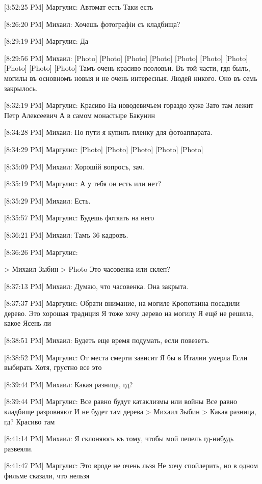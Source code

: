 \documentclass{article}
\newcommand{\yat}{{\fontencoding{X2}\selectfont\cyryat}} %
\begin{document}
{[3:52:25 PM] Маргулис:
Автомат есть
 Таки есть

[8:26:20 PM] Михаил:
Хочешь фотографіи съ кладбища?

[8:29:19 PM] Маргулис:
Да

[8:29:56 PM] Михаил:
[Photo]
 [Photo]
 [Photo]
 [Photo]
 [Photo]
 [Photo]
 [Photo]
 [Photo]
 [Photo]
 [Photo]
 Тамъ очень красиво п соловьи. Въ той части, гд\yat я былъ, могилы въ основномъ новыя и не очень интересныя.
 Людей никого.
 Оно въ семь закрылось.

[8:32:19 PM] Маргулис:
Красиво
 На новодевичьем гораздо хуже
 Зато там лежит Петр Алексеевич
 А в самом монастыре Бакунин

[8:34:28 PM] Михаил:
По пути я купилъ пленку для фотоаппарата.

[8:34:29 PM] Маргулис:
[Photo]
 [Photo]
 [Photo]
 [Photo]
 [Photo]

[8:35:09 PM] Михаил:
Хорошій вопросъ, зач.

[8:35:19 PM] Маргулис:
А у тебя он есть или нет?

[8:35:29 PM] Михаил:
Есть.

[8:35:57 PM] Маргулис:
Будешь фоткать на него

[8:36:21 PM] Михаил:
Тамъ 36 кадровъ.

[8:36:26 PM] Маргулис:

> Михаил Зыбин
>  Photo
Это часовенка или склеп?

[8:37:13 PM] Михаил:
Думаю, что часовенка. Она закрыта.

[8:37:37 PM] Маргулис:
Обрати внимание, на могиле Кропоткина посадили дерево. Это хорошая традиция
 Я тоже хочу дерево на могилу
 Я ещё не решила, какое
 Ясень ли

[8:38:51 PM] Михаил:
Будетъ еще время подумать, если повезетъ.

[8:38:52 PM] Маргулис:
От места смерти зависит
 Я бы в Италии умерла
 Если выбирать
 Хотя, грустно все это

[8:39:44 PM] Михаил:
Какая разница, гд\yat?

[8:39:44 PM] Маргулис:
Все равно будут катаклизмы или войны
 Все равно кладбище разровняют
 И не будет там дерева
> Михаил Зыбин
> Какая разница, гд\yat?
Красиво там

[8:41:14 PM] Михаил:
Я склоняюсь къ тому, чтобы мой пепелъ гд\yat-нибудь развеяли.

[8:41:47 PM] Маргулис:
Это вроде не очень льзя
 Не хочу спойлерить, но в одном фильме сказали, что нельзя

}
\end{document}
